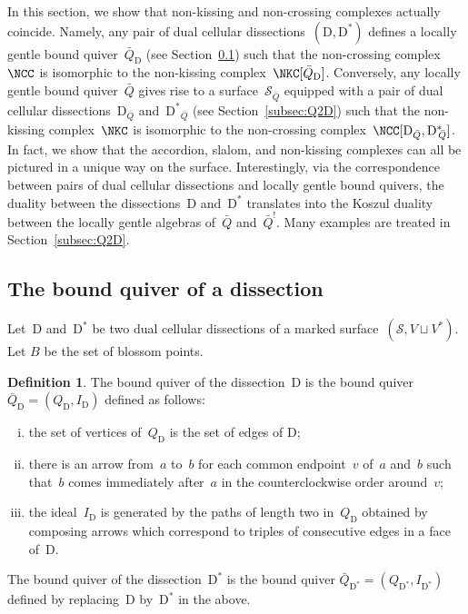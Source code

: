 \documentclass{amsart}
\theoremstyle{definition}
\newtheorem{definition}[theorem]{Definition}
\newcommand{\surface}{\mathcal{S}} %
\newcommand{\dual}{^*} %
\newcommand{\dissection}{\mathrm{D}} %
\newcommand{\koszul}{^!} %
\begin{document}
\enlargethispage{-.2cm}
In this section, we show that non-kissing and non-crossing complexes actually coincide.
Namely, any pair of dual cellular dissections~$(\dissection, \dissection\dual)$ defines a locally gentle bound quiver~$\bar Q_{\dissection}$ (see Section~\ref{subsec:D2Q}) such that the non-crossing complex~$\NCC$ is isomorphic to the non-kissing complex~$\NKC[\bar Q_{\dissection}]$.
Conversely, any locally gentle bound quiver~$\bar Q$ gives rise to a surface~$\surface_{\bar Q}$ equipped with a pair of dual cellular dissections~$\dissection_{\bar Q}$ and~${{\dissection\dual}\!\!_{\bar Q}}$ (see Section~\ref{subsec:Q2D}) such that the non-kissing complex~$\NKC$ is isomorphic to the non-crossing complex~$\NCC[\dissection_{\bar Q}, {\dissection\dual\!\!_{\bar Q}}]$.
In fact, we show that the accordion, slalom, and non-kissing complexes can all be pictured in a unique way on the surface.
Interestingly, via the correspondence between pairs of dual cellular dissections and locally gentle bound quivers, the duality between the dissections~$\dissection$ and~$\dissection\dual$ translates into the Koszul duality between the locally gentle algebras of~$\bar Q$ and~$\bar Q\koszul$.
Many examples are treated in Section~\ref{subsec:Q2D}.

\subsection{The bound quiver of a dissection}
\label{subsec:D2Q}

Let~$\dissection$ and~$\dissection\dual$ be two dual cellular dissections of a marked surface~$(\surface, V\sqcup V\dual)$.
Let $B$ be the set of blossom points.

\begin{definition}
\label{def:quiverDualDissections}
The bound quiver of the dissection~$\dissection$ is the bound quiver $\bar Q_{\dissection} = (Q_{\dissection}, I_{\dissection})$ defined as follows:
\begin{enumerate}[(i)]
\item the set of vertices of~$Q_{\dissection}$ is the set of edges of $\dissection$;
\item there is an arrow from~$a$ to~$b$ for each common endpoint~$v$ of~$a$ and~$b$ such that~$b$ comes immediately after~$a$ in the counterclockwise order around~$v$;
\item the ideal~$I_{\dissection}$ is generated by the paths of length two in~$Q_{\dissection}$ obtained by composing arrows which correspond to triples of consecutive edges in a face of~$\dissection$.
\end{enumerate}
The bound quiver of the dissection~$\dissection\dual$ is the bound quiver $\bar Q_{\dissection\dual} = (Q_{\dissection\dual}, I_{\dissection\dual})$ defined by replacing~$\dissection$ by~$\dissection\dual$ in the above.
\end{definition}
\end{document}
